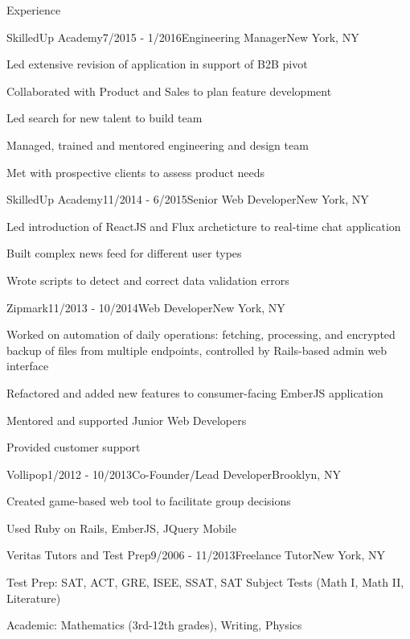 \documentclass{resume} %
\begin{document}
\begin{rSection}{Experience}

\begin{rSubsection}{SkilledUp Academy}{7/2015 - 1/2016}{Engineering Manager}{New York, NY}
\item Led extensive revision of application in support of B2B pivot 
\item Collaborated with Product and Sales to plan feature development
\item Led search for new talent to build team
\item Managed, trained and mentored engineering and design team
\item Met with prospective clients to assess product needs
\end{rSubsection}

\begin{rSubsection}{SkilledUp Academy}{11/2014 - 6/2015}{Senior Web Developer}{New York, NY}
\item Led introduction of ReactJS and Flux archeticture to real-time chat application
\item Built complex news feed for different user types 
\item Wrote scripts to detect and correct data validation errors
\end{rSubsection}

\begin{rSubsection}{Zipmark}{11/2013 - 10/2014}{Web Developer}{New York, NY}
\item Worked on automation of daily operations: fetching, processing, and encrypted backup of files from multiple endpoints, controlled by Rails-based admin web interface
\item Refactored and added new features to consumer-facing EmberJS application
\item Mentored and supported Junior Web Developers
\item Provided customer support
\end{rSubsection}

\begin{rSubsection}{Vollipop}{1/2012 - 10/2013}{Co-Founder/Lead Developer}{Brooklyn, NY}
\item Created game-based web tool to facilitate group decisions
\item Used Ruby on Rails, EmberJS, JQuery Mobile
\end{rSubsection}

\begin{rSubsection}{Veritas Tutors and Test Prep}{9/2006 - 11/2013}{Freelance Tutor}{New York, NY}
\item Test Prep: SAT, ACT, GRE, ISEE, SSAT, SAT Subject Tests (Math I, Math II, Literature)
\item Academic: Mathematics (3rd-12th grades), Writing, Physics
\end{rSubsection}


\end{rSection}
\end{document}

